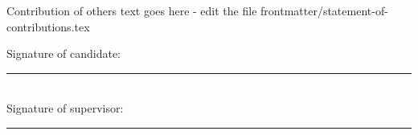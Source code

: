 Contribution of others text goes here - edit the file frontmatter/statement-of-contributions.tex

\vspace{1cm}
\begin{raggedleft} 
  Signature of candidate:  \hspace{0.2cm}\rule{45mm}{.15mm} \\[1cm]
  Signature of supervisor: \hspace{0.2cm}\rule{45mm}{.15mm} \\ 
\end{raggedleft}